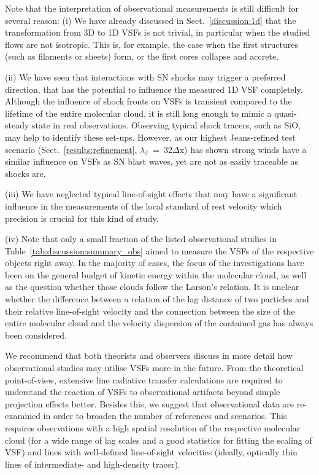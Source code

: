 Note that the interpretation of observational measurements is still difficult for several reason:
(i) We have already discussed in Sect.~\ref{discussion:1d} that the transformation from 3D to 1D VSFs is not trivial, in particular when the studied flows are not isotropic.
This is, for example, the case when the first structures (such as filaments or sheets) form, or the first cores collapse and accrete.

(ii) We have seen that interactions with SN shocks may trigger a preferred direction, that has the potential to influence the measured 1D VSF completely.
Although the influence of shock fronts on VSFs is transient compared to the lifetime of the entire molecular cloud, it is still long enough to mimic a quasi-steady state in real observations.
Observing typical shock tracers, such as SiO, may help to identify these set-ups. 
However, as our highest Jeans-refined test scenario (Sect.~\ref{results:refinement}, $\lambda_\mathrm{J}$~=~32$\Delta$x) has shown strong winds have a similar influence on VSFs as SN blast waves, yet are not as easily traceable as shocks are. 

(iii) We have neglected typical line-of-sight effects that may have a significant influence in the measurements of the local standard of rest velocity which precision is crucial for this kind of study.

(iv) Note that only a small fraction of the listed observational studies in Table~\ref{tab:discussion:summary_obs} aimed to measure the VSFs of the respective objects right away.
In the majority of cases, the focus of the investigations have been on the general budget of kinetic energy within the molecular cloud, as well as the question whether those clouds follow the Larson's relation.
It is unclear whether the difference between a relation of the lag distance of two particles and their relative line-of-sight velocity and the connection between the size of the entire molecular cloud and the velocity dispersion of the contained gas has always been considered.


We recommend that both theorists and observers discuss in more detail how observational studies may utilise VSFs more in the future.
From the theoretical point-of-view, extensive line radiative transfer calculations are required to understand the reaction of VSFs to observational artifacts beyond simple projection effects better.
Besides this, we suggest that observational data are re-examined in order to broaden the number of references and scenarios. 
This requires observations with a high spatial resolution of the respective molecular cloud (for a wide range of lag scales and a good statistics for fitting the scaling of VSF) and lines with well-defined line-of-sight velocities (ideally, optically thin lines of intermediate- and high-density tracer). 










